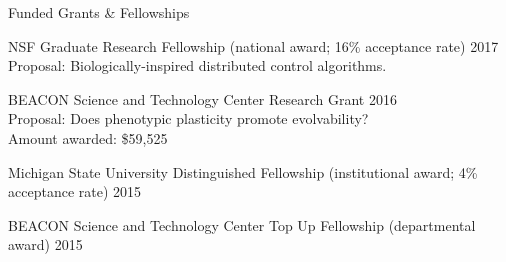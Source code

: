 \begin{rSection}{Funded Grants \& Fellowships}

NSF Graduate Research Fellowship (national award; 16\% acceptance rate) \hfill 2017 \\
\tab Proposal: Biologically-inspired distributed control algorithms.

BEACON Science and Technology Center Research Grant \hfill 2016 \\
\tab Proposal: Does phenotypic plasticity promote evolvability? \\
\tab Amount awarded: \$59,525

Michigan State University Distinguished Fellowship (institutional award; 4\% acceptance rate) \hfill 2015

BEACON Science and Technology Center Top Up Fellowship (departmental award) \hfill 2015

\end{rSection}